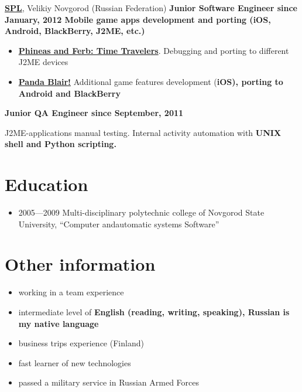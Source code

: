 {
\vspace{15pt}
\fontsize{12pt}{12pt}\selectfont
\href{http://spl.co}{\bfseries SPL\mdseries},
Velikiy Novgorod (Russian Federation)
}
\subitem \bfseries Junior Software Engineer \mdseries since January, 2012
\subitem Mobile game apps development and porting
(iOS, Android, BlackBerry, J2ME, etc.)
\begin{itemize}
\setlength{\itemindent}{20pt}
\item
    \href{http://java.mob.org/game/phineas\_and\_ferb\_time\_travelers.html}
        {\bfseries Phineas and Ferb: Time Travelers\mdseries}.
        Debugging and porting to different J2ME devices
\item
    \href{https://itunes.apple.com/us/app/panda-blair!/id500995558?mt=8}
        {\bfseries Panda Blair!\mdseries}
        Additional game features development (\bfseries iOS\mdseries),
        porting to \bfseries Android \mdseries and \bfseries BlackBerry\mdseries
\end{itemize}

\vspace{5pt}
\subitem \bfseries Junior QA Engineer \mdseries since September, 2011

\subitem J2ME-applications manual testing. Internal activity automation with
\bfseries UNIX shell \mdseries and \bfseries Python \mdseries scripting.

\section{Education}
\begin{itemize}
\item 2005---2009 Multi-disciplinary polytechnic college of
Novgorod State University,
``Computer and\linebreak automatic systems Software''
\end{itemize}

\section{Other information}
\begin{itemize}
\item working in a team experience
\item intermediate level of \bfseries English \mdseries (reading, writing, speaking),
Russian is my native language
\item business trips experience (Finland)
\item fast learner of new technologies
\item passed a military service in Russian Armed Forces
\end{itemize}

